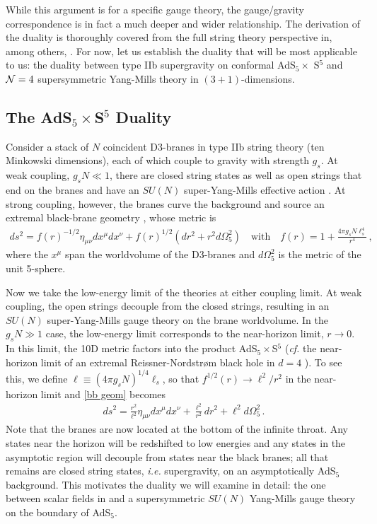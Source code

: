 \documentclass[../PhD.tex]{subfiles}
\begin{document}
While this argument is for a specific gauge theory, the gauge/gravity correspondence is in fact a much deeper and wider relationship. The derivation of the duality is thoroughly covered from the full string theory perspective in, among others, \cite{hep-th/9711200, gr-qc/0602037, 1501.00007, hep-th/9902131, hep-th/9905111}. For now, let us establish the duality that will be most applicable to us: the duality between type IIb supergravity on conformal AdS$_5 \times$ S$^5$ and $\mathcal N = 4$ supersymmetric Yang-Mills theory in $(3+1)$-dimensions.


\subsection{The AdS$_5 \times$S$^5$ Duality}
\label{ssec: AdS5xS5}

Consider a stack of $N$ coincident D3-branes in type IIb string theory (ten Minkowski dimensions), each of which couple to gravity with strength $g_s$. At weak coupling, $g_s N \ll 1$, there are closed string states as well as open strings that end on the branes and have an $SU(N)$ super-Yang-Mills effective action \cite{Zwiebach:2004tj}. At strong coupling, however, the branes curve the background and source an extremal black-brane geometry \cite{Horowitz:1991cd}, whose metric is
\begin{align}
\label{bb geom}
ds^2 = f(r)^{-1/2} \eta_{\mu \nu} dx^\mu dx^\nu + f(r)^{1/2} \left(  dr^2 + r^2 d\Omega_5^2 \right)  \quad  \text{with} \quad f(r) = 1 + \frac{4 \pi g_s N \ell_s^4}{r^4} \, ,
\end{align}
where the $x^\mu$ span the worldvolume of the D3-branes and $d\Omega_5^2$ is the metric of the unit 5-sphere.

Now we take the low-energy limit of the theories at either coupling limit. At weak coupling, the open strings decouple from the closed strings, resulting in an $SU(N)$ super-Yang-Mills gauge theory on the brane worldvolume. In the $g_s N \gg 1$ case, the low-energy limit corresponds to the near-horizon limit, $r \to 0$. In this limit, the 10D metric factors into the product AdS$_5 \times$S$^5$ ({\it cf.} the near-horizon limit of an extremal Reissner-Nordstr\o m black hole in $d=4$ \cite{Horowitz:1991cd}). To see this, we define $\ell \equiv (4\pi g_s N)^{1/4} \ell_s$, so that $f^{1/2}(r) \to \ell^2 / r^2$ in the near-horizon limit and \eqref{bb geom} becomes
\begin{align}
\label{param rels}
ds^2 = \frac{r^2}{\ell^2} \eta_{\mu \nu} dx^\mu dx^\nu + \frac{\ell^2}{r^2}dr^2 + \ell^2 d\Omega_5^2 \, .
\end{align}
Note that the branes are now located at the bottom of the infinite throat. Any states near the horizon will be redshifted to low energies and any states in the asymptotic region will decouple from states near the black branes; all that remains are closed string states, {\it i.e.} supergravity, on an asymptotically AdS$_5$ background. This motivates the duality we will examine in detail: the one between scalar fields in \ads and a supersymmetric $SU(N)$ Yang-Mills gauge theory on the boundary of AdS$_5$.
\end{document}
